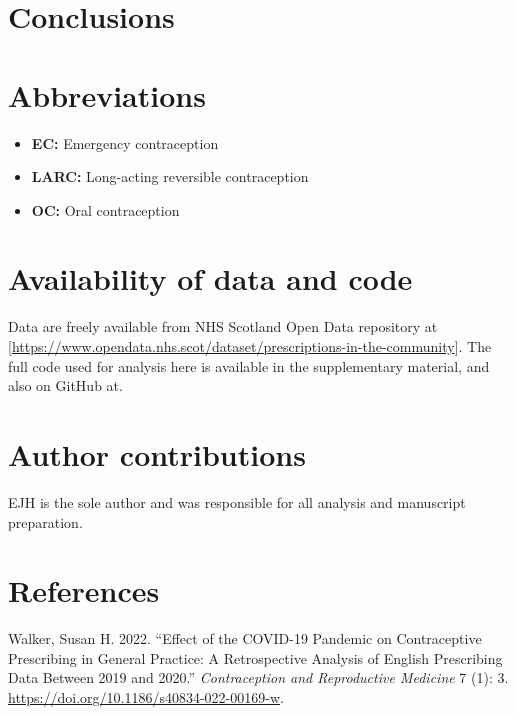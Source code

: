 \documentclass{article}
\providecommand{\tightlist}{%
  \setlength{\itemsep}{0pt}\setlength{\parskip}{0pt}}
\newlength{\cslhangindent}
\newlength{\cslentryspacingunit} %
\newenvironment{CSLReferences}[2] %
 {%
  \setlength{\parindent}{0pt}
  \ifodd #1
  \let\oldpar\par
  \def\par{\hangindent=\cslhangindent\oldpar}
  \fi
  \setlength{\parskip}{#2\cslentryspacingunit}
 }%
 {}
\begin{document}
\hypertarget{conclusions}{%
\section{Conclusions}\label{conclusions}}

\hypertarget{abbreviations}{%
\section{Abbreviations}\label{abbreviations}}

\begin{itemize}
\tightlist
\item
  \textbf{EC:} Emergency contraception
\item
  \textbf{LARC:} Long-acting reversible contraception
\item
  \textbf{OC:} Oral contraception
\end{itemize}

\hypertarget{availability-of-data-and-code}{%
\section{Availability of data and
code}\label{availability-of-data-and-code}}

Data are freely available from NHS Scotland Open Data repository at
{[}\url{https://www.opendata.nhs.scot/dataset/prescriptions-in-the-community}{]}.
The full code used for analysis here is available in the supplementary
material, and also on GitHub at.

\hypertarget{author-contributions}{%
\section{Author contributions}\label{author-contributions}}

EJH is the sole author and was responsible for all analysis and
manuscript preparation.

\hypertarget{references}{%
\section*{References}\label{references}}

\hypertarget{refs}{}
\begin{CSLReferences}{1}{0}
\leavevmode{}%
Walker, Susan H. 2022. {``Effect of the COVID-19 Pandemic on
Contraceptive Prescribing in General Practice: A Retrospective Analysis
of English Prescribing Data Between 2019 and 2020.''}
\emph{Contraception and Reproductive Medicine} 7 (1): 3.
\url{https://doi.org/10.1186/s40834-022-00169-w}.

\end{CSLReferences}



\end{document}
